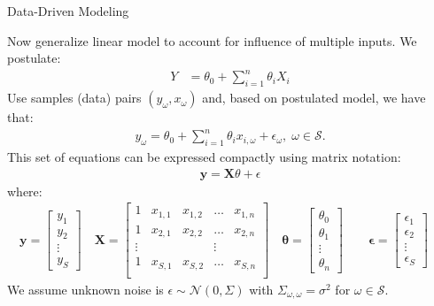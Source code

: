\documentclass[9pt]{beamer}
\begin{document}
%
\begin{frame}{Data-Driven Modeling}

Now generalize linear model to account for influence of multiple inputs. We postulate:
\begin{align*}
Y&=\theta_0+\sum_{i=1}^n\theta_iX_i
\end{align*}
Use samples (data) pairs $(y_\omega,x_\omega)$ and, based on postulated model, we have that:
\begin{align*}
y_\omega=\theta_0+\sum_{i=1}^n\theta_i x_{i,\omega} + \epsilon_\omega,\; \omega \in \mathcal{S}.
\end{align*}
This set of equations can be expressed compactly using matrix notation:
\begin{align*}
\mathbf{y}=\mathbf{X}\theta + \epsilon
\end{align*}
where:
\begin{align*}
\mathbf{y}=\left[\begin{array}{c}y_1\\y_2\\\vdots \\ y_S\end{array}\right]\quad 
\mathbf{X}=\left[\begin{array}{ccccc}1&x_{1,1}&x_{1,2}&\hdots&x_{1,n}\\
1&x_{2,1}&x_{2,2}&\hdots&x_{2,n}\\
\vdots&&&\vdots\\
1&x_{S,1}&x_{S,2}&\hdots&x_{S,n}\\
\end{array}\right]\quad \mathbf{\theta}=\left[\begin{array}{c}\theta_0\\\theta_1\\\vdots \\ \theta_n\end{array}\right]\quad 
\quad \mathbf{\epsilon}=\left[\begin{array}{c}\epsilon_1\\\epsilon_2\\\vdots \\ \epsilon_S\end{array}\right]\quad 
\end{align*}
We assume unknown noise is $\epsilon\sim \mathcal{N}(0,\Sigma)$ with $\Sigma_{\omega,\omega}=\sigma^2$ for $\omega\in\mathcal{S}$. 

\end{frame}
\end{document}
